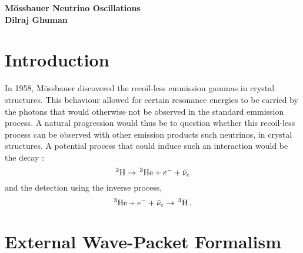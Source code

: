 \documentclass[10pt]{article}
\begin{document}
\begin{center}
  {\Large \bf M\"{o}ssbauer Neutrino Oscillations}\\
  {\small \bf Dilraj Ghuman}
\end{center}
\vspace{2em}

\section{Introduction}

In 1958, M\"{o}ssbauer discovered the recoil-less emmission gammas in crystal structures. This behaviour allowed for certain resonance energies to be carried by the photons that would otherwise not be observed in the standard emmission process. A natural progression would thus be to question whether this recoil-less process can be observed with other emission products such neutrinos, in crystal structures. A potential process that could induce such an interaction would be the decay :
\[^{3} \textnormal{H} \to\,  ^{3}\textnormal{He} + e^{-} + \bar{\nu}_{e}\]
and the detection using the inverse process,
\[^{3}\textnormal{He} + e^{-} + \bar{\nu}_{e} \to\, ^{3} \textnormal{H}\, .\]

\section{External Wave-Packet Formalism}
\end{document}
